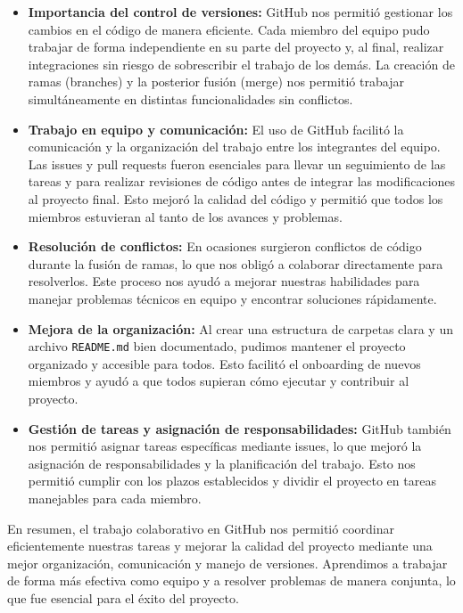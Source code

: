 \documentclass{article}
\begin{document}
    \begin{itemize}
        \item \textbf{Importancia del control de versiones:} GitHub nos permitió gestionar los cambios en el código de manera eficiente. Cada miembro del equipo pudo trabajar de forma independiente en su parte del proyecto y, al final, realizar integraciones sin riesgo de sobrescribir el trabajo de los demás. La creación de ramas (branches) y la posterior fusión (merge) nos permitió trabajar simultáneamente en distintas funcionalidades sin conflictos.
        
        \item \textbf{Trabajo en equipo y comunicación:} El uso de GitHub facilitó la comunicación y la organización del trabajo entre los integrantes del equipo. Las issues y pull requests fueron esenciales para llevar un seguimiento de las tareas y para realizar revisiones de código antes de integrar las modificaciones al proyecto final. Esto mejoró la calidad del código y permitió que todos los miembros estuvieran al tanto de los avances y problemas.
    
        \item \textbf{Resolución de conflictos:} En ocasiones surgieron conflictos de código durante la fusión de ramas, lo que nos obligó a colaborar directamente para resolverlos. Este proceso nos ayudó a mejorar nuestras habilidades para manejar problemas técnicos en equipo y encontrar soluciones rápidamente.
    
        \item \textbf{Mejora de la organización:} Al crear una estructura de carpetas clara y un archivo \texttt{README.md} bien documentado, pudimos mantener el proyecto organizado y accesible para todos. Esto facilitó el onboarding de nuevos miembros y ayudó a que todos supieran cómo ejecutar y contribuir al proyecto.
        
        \item \textbf{Gestión de tareas y asignación de responsabilidades:} GitHub también nos permitió asignar tareas específicas mediante issues, lo que mejoró la asignación de responsabilidades y la planificación del trabajo. Esto nos permitió cumplir con los plazos establecidos y dividir el proyecto en tareas manejables para cada miembro.
    \end{itemize}
    
    En resumen, el trabajo colaborativo en GitHub nos permitió coordinar eficientemente nuestras tareas y mejorar la calidad del proyecto mediante una mejor organización, comunicación y manejo de versiones. Aprendimos a trabajar de forma más efectiva como equipo y a resolver problemas de manera conjunta, lo que fue esencial para el éxito del proyecto.
    
\end{document}
